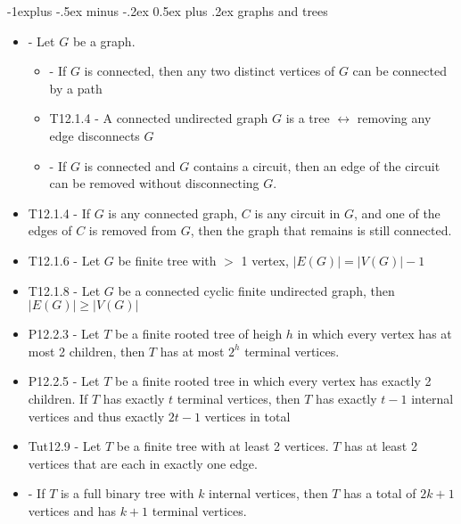\documentclass[10pt, landscape]{article}
\makeatletter
\renewcommand{\subsection}{\@startsection{subsection}{2}{0mm}%
                                {-1explus -.5ex minus -.2ex}%
                                {0.5ex plus .2ex}%
                                {\normalfont\normalsize\bfseries}}
\let\iff\leftrightarrow
\makeatother
\begin{document}
\begin{multicols}{3}
    \subsection{graphs and trees}
    \begin{itemize}
        \item - Let $G$ be a graph.
        \begin{itemize}
            \item - If $G$ is connected, then any two distinct vertices of $G$ can be connected by a path
            \item T12.1.4 - A connected undirected graph $G$ is a tree $\iff$ removing any edge disconnects $G$
            \item - If $G$ is connected and $G$ contains a circuit, then an edge of the circuit can be removed without disconnecting $G$.
        \end{itemize}
        \item T12.1.4 - If $G$ is any connected graph, $C$ is any circuit in $G$, and one of the edges of $C$ is removed from $G$, then the graph that remains is still connected.
        \item T12.1.6 - Let $G$ be finite tree with $>$ 1 vertex, $|E(G)| = |V(G)| - 1$
        \item T12.1.8 - Let $G$ be a connected cyclic finite undirected graph, then $|E(G)| \geq |V(G)|$
        \item P12.2.3 - Let $T$ be a finite rooted tree of heigh $h$ in which every vertex has at most 2 children, then $T$ has at most $2^h$ terminal vertices.
        \item P12.2.5 - Let $T$ be a finite rooted tree in which every vertex has exactly 2 children. If $T$ has exactly $t$ terminal vertices, then $T$ has exactly $t-1$ internal vertices and thus exactly $2t-1$ vertices in total
        \item Tut12.9 - Let $T$ be a finite tree with at least 2 vertices. $T$ has at least 2 vertices that are each in exactly one edge.
        \item - If $T$ is a full binary tree with $k$ internal vertices, then $T$ has a total of $2k + 1$ vertices and has $k+1$ terminal vertices.
    \end{itemize}

\begin{center}
\end{center}
\end{multicols}
\end{document}
